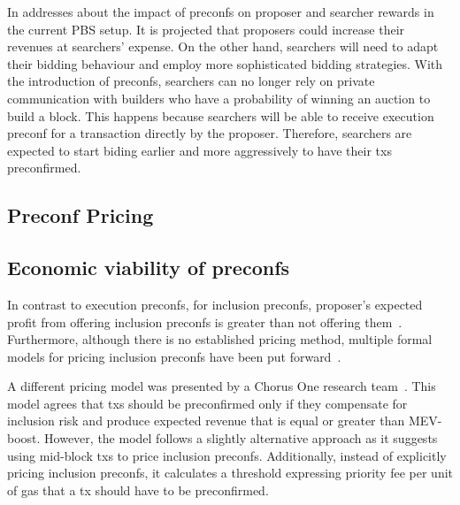 \documentclass[a4paper]{article}
\theoremstyle{boldstyle}
\begin{document}
    In \cite{W:PreconfirmationsundertheNOlens} addresses about the impact of preconfs on proposer and searcher rewards in the current PBS setup. It is projected that proposers could increase their revenues at searchers' expense. On the other hand, searchers will need to adapt their bidding behaviour and employ more sophisticated bidding strategies. With the introduction of preconfs, searchers can no longer rely on private communication with builders who have a probability of winning an auction to build a block. This happens because searchers will be able to receive execution preconf for a transaction directly by the proposer. Therefore, searchers are expected to start biding earlier and more aggressively to have their txs preconfirmed.
    
    \subsection{Preconf Pricing}

     
    
\subsection{Economic viability of preconfs} 
\label{EconomicViabilityOfPreconfs}
    

 
    

    In contrast to execution preconfs, for inclusion preconfs, proposer's expected profit from offering inclusion preconfs is greater than not offering them~\cite{W:AnalysingExpectedProposerRevenuefromPreconfirmations}. Furthermore, although there is no established pricing method, multiple formal models for pricing inclusion preconfs have been put forward~\cite{W:APricingModelforInclusionPreconfirmations,W:PricingTransactionsforPreconfirmation}.

    

    A different pricing model was presented by a Chorus One research team~\cite{W:PricingTransactionsforPreconfirmation}. This model agrees that txs should be preconfirmed only if they compensate for inclusion risk and produce expected revenue that is equal or greater than MEV-boost. However, the model follows a slightly alternative approach as it suggests using mid-block txs to price inclusion preconfs. Additionally, instead of explicitly pricing inclusion preconfs, it calculates a threshold expressing priority fee per unit of gas that a tx should have to be preconfirmed.
\end{document}
